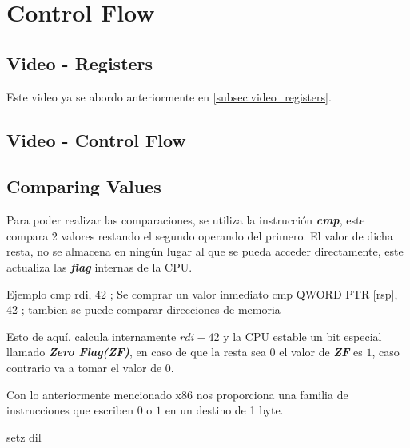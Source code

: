 \section{Control Flow}\label{sec:07control_flow}

\sectiontoc

\subsection{Video - Registers}

Este video ya se abordo anteriormente en \ref{subsec:video_registers}.

\subsection{Video - Control Flow}\label{subsec:video_control_flow}

\subsection{Comparing Values} \label{subsec:comparing_values}

Para poder realizar las comparaciones, se utiliza la instrucción \textbf{\textit{cmp}},
este compara 2 valores restando el segundo operando del primero.
El valor de dicha resta, no se almacena en ningún lugar al que se pueda
acceder directamente, este actualiza las \textbf{\textit{flag}} internas de la CPU.

\begin{codebox}[ASM]{Ejemplo}
	cmp rdi, 42             ; Se comprar un valor inmediato
	cmp QWORD PTR [rsp], 42 ; tambien se puede comparar direcciones de memoria
\end{codebox}

Esto de aquí, calcula internamente \( rdi - 42 \) y la CPU estable un bit
especial llamado \textbf{\textit{Zero Flag(ZF)}}, en caso de que la resta
sea \( 0 \) el valor de \textbf{\textit{ZF}} es \( 1 \), caso contrario va a tomar el valor de \( 0 \).

Con lo anteriormente mencionado x86 nos proporciona una familia de instrucciones
que escriben \( 0 \) o \( 1 \) en un destino de 1 byte.

\begin{codebox}[ASM]{}
	setz dil
\end{codebox}

